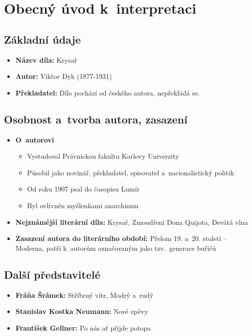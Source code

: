 \section{Obecný úvod k~interpretaci}

\subsection{Základní údaje}
\begin{itemize}
    \item \textbf{Název díla:} Krysař
    \item \textbf{Autor:} Viktor Dyk (1877-1931)
    \item \textbf{Překladatel:} Dílo pochází od českého autora, nepřekládá se.
\end{itemize}

\subsection{Osobnost a~tvorba autora, zasazení}
\begin{itemize}
    \item \textbf{O~autorovi}\cite[150]{didaktis:literatura2}\cite{wiki:Viktor_Dyk}
    \begin{itemize}
        \item Vystudoval Právnickou fakultu Karlovy Univerzity
        \item Působil jako novinář, překladatel, spisovatel a~nacionalistický politik
        \item Od roku 1907 psal do časopisu Lumír
        \item Byl ovlivněn myšlenkami anarchismu
    \end{itemize}
    \item \textbf{Nejznámější literární díla:} Krysař, Zmoudření Dona Quijota, Devátá vlna
    \item \textbf{Zasazení autora do literárního období:} Přelom 19. a~20. století -- Moderna, patří k~autorům označovaným jako tzv.~generace buřičů
\end{itemize}

\subsection{Další představitelé\cite{wiki:anarchističtí_buřiči}}
\begin{itemize}
	\item \textbf{Fráňa Šrámek:} Stříbrný vítr, Modrý a~rudý
	\item \textbf{Stanislav Kostka Neumann:} Nové zpěvy
	\item \textbf{František Gellner:} Po nás ať přijde potopa
\end{itemize}

